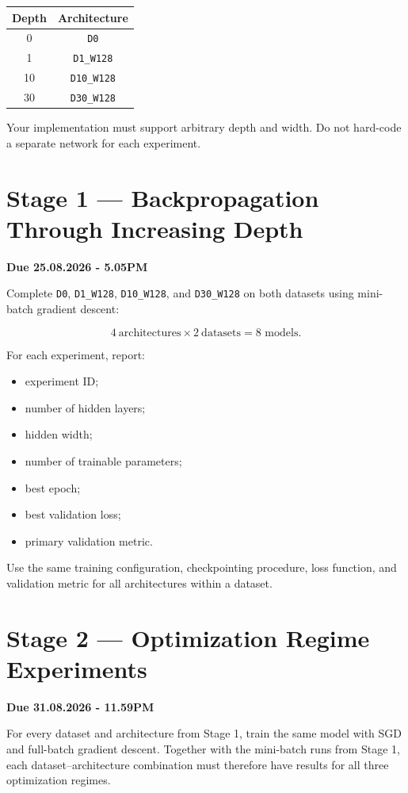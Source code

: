 \documentclass[11pt,a4paper]{article}
\newcommand{\code}[1]{\texttt{#1}}
\begin{document}
\begin{center}
\begin{tabular}{cc}
\toprule
\textbf{Depth} & \textbf{Architecture} \\
\midrule
0 & \code{D0} \\
1 & \code{D1\_W128} \\
10 & \code{D10\_W128} \\
30 & \code{D30\_W128} \\
\bottomrule
\end{tabular}
\end{center}

Your implementation must support arbitrary depth and width. Do not hard-code a separate network for each experiment.

\section{Stage 1 --- Backpropagation Through Increasing Depth}

\textbf{Due 25.08.2026 - 5.05PM}

Complete \code{D0}, \code{D1\_W128}, \code{D10\_W128}, and \code{D30\_W128} on both datasets using mini-batch gradient descent:

\[
4\ \text{architectures}\times2\ \text{datasets}
=\boxed{8\text{ models}}.
\]

For each experiment, report:
\begin{itemize}
    \item experiment ID;
    \item number of hidden layers;
    \item hidden width;
    \item number of trainable parameters;
    \item best epoch;
    \item best validation loss;
    \item primary validation metric.
\end{itemize}

Use the same training configuration, checkpointing procedure, loss function, and validation metric for all architectures within a dataset.

\section{Stage 2 --- Optimization Regime Experiments}

\textbf{Due 31.08.2026 - 11.59PM}

For every dataset and architecture from Stage 1, train the same model with SGD and full-batch gradient descent. Together with the mini-batch runs from Stage 1, each dataset--architecture combination must therefore have results for all three optimization regimes.
\end{document}
